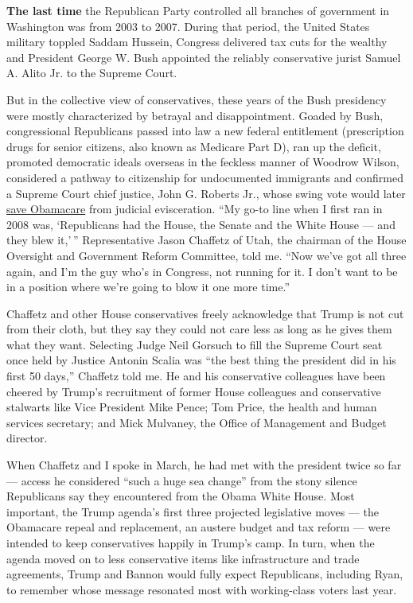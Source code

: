 \textbf{The last time} the Republican Party controlled all branches of
government in Washington was from 2003 to 2007. During that period, the
United States military toppled Saddam Hussein, Congress delivered tax
cuts for the wealthy and President George W. Bush appointed the reliably
conservative jurist Samuel A. Alito Jr. to the Supreme Court.

But in the collective view of conservatives, these years of the Bush
presidency were mostly characterized by betrayal and disappointment.
Goaded by Bush, congressional Republicans passed into law a new federal
entitlement (prescription drugs for senior citizens, also known as
Medicare Part D), ran up the deficit, promoted democratic ideals
overseas in the feckless manner of Woodrow Wilson, considered a pathway
to citizenship for undocumented immigrants and confirmed a Supreme Court
chief justice, John G. Roberts Jr., whose swing vote would later
\href{http://www.nytimes3xbfgragh.onion/2012/06/29/us/supreme-court-lets-health-law-largely-stand.html}{save
Obamacare} from judicial evisceration. ``My go-to line when I first ran
in 2008 was, `Republicans had the House, the Senate and the White House
--- and they blew it,' '' Representative Jason Chaffetz of Utah, the
chairman of the House Oversight and Government Reform Committee, told
me. ``Now we've got all three again, and I'm the guy who's in Congress,
not running for it. I don't want to be in a position where we're going
to blow it one more time.''

Chaffetz and other House conservatives freely acknowledge that Trump is
not cut from their cloth, but they say they could not care less as long
as he gives them what they want. Selecting Judge Neil Gorsuch to fill
the Supreme Court seat once held by Justice Antonin Scalia was ``the
best thing the president did in his first 50 days,'' Chaffetz told me.
He and his conservative colleagues have been cheered by Trump's
recruitment of former House colleagues and conservative stalwarts like
Vice President Mike Pence; Tom Price, the health and human services
secretary; and Mick Mulvaney, the Office of Management and Budget
director.

When Chaffetz and I spoke in March, he had met with the president twice
so far --- access he considered ``such a huge sea change'' from the
stony silence Republicans say they encountered from the Obama White
House. Most important, the Trump agenda's first three projected
legislative moves --- the Obamacare repeal and replacement, an austere
budget and tax reform --- were intended to keep conservatives happily in
Trump's camp. In turn, when the agenda moved on to less conservative
items like infrastructure and trade agreements, Trump and Bannon would
fully expect Republicans, including Ryan, to remember whose message
resonated most with working-class voters last year.


